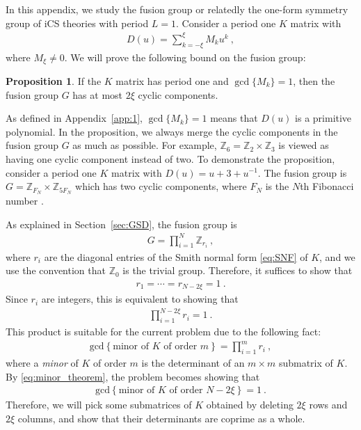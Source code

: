 \documentclass[aps,prb,twocolumn,superscriptaddress,floatfix,10pt,nofootinbib]{revtex4-2}
\newcommand{\ie}{\begin{equation}\begin{aligned}}
\newcommand{\fe}{\end{aligned}\end{equation}}
\theoremstyle{definition}
\newtheorem{proposition}[definition]{Proposition}
\begin{document}
In this appendix, we study the fusion group or relatedly the one-form symmetry group of iCS theories with period $L=1$. Consider a period one $K$ matrix with
\ie
D(u)=\sum_{k=-\xi}^\xi M_ku^k~,
\fe
where $M_\xi\neq0$. We will prove the following bound on the fusion group:
\begin{proposition}\label{prop:fusion}
    If the $K$ matrix has period one and $\gcd\{M_k\}=1$, then the fusion group $G$ has at most $2\xi$ cyclic components.
\end{proposition}
\noindent 
As defined in Appendix~\ref{app:1}, $\gcd\{M_k\}=1$ means that $D(u)$ is a primitive polynomial. In the proposition, we always merge the cyclic components in the fusion group $G$ as much as possible. For example, $\mathbb{Z}_6=\mathbb{Z}_2\times\mathbb{Z}_3$ is viewed as having one cyclic component instead of two.  
To demonstrate the proposition, consider a period one $K$ matrix with $D(u)=u+3+u^{-1}$. The fusion group is $G=\mathbb{Z}_{F_N}\times\mathbb{Z}_{5F_N}$ which has two cyclic components, where $F_N$ is the $N$th Fibonacci number \cite{Ma:2020svo}.

As explained in Section~\ref{sec:GSD}, the fusion group is
\ie
G=\prod_{i=1}^{N}\mathbb{Z}_{r_i}~,
\fe
where $r_i$ are the diagonal entries of the Smith normal form \eqref{eq:SNF} of $K$, and we use the convention that $\mathbb{Z}_0$ is the trivial group. Therefore, it suffices to show that
\ie
r_1=\cdots=r_{N-2\xi}=1~.
\fe
Since $r_i$ are integers, this is equivalent to showing that
\ie\label{eq:fusion_group_product}
\prod_{i=1}^{N-2\xi}r_i=1~.
\fe
This product is suitable for the current problem due to the following fact:
\ie\label{eq:minor_theorem}
\text{gcd}\left\{\text{minor of } K \text{ of order $m$}\right\}=\prod_{i=1}^{m}r_i~,
\fe
where a \textit{minor} of $K$ of order $m$ is the determinant of an $m\times m$ submatrix of $K$. By \eqref{eq:minor_theorem}, the problem becomes showing that
\ie\label{eq:minor_fusion}
\text{gcd}\left\{\text{minor of } K \text{ of order $N-2\xi$}\right\}=1~.
\fe
Therefore, we will pick some submatrices of $K$ obtained by deleting $2\xi$ rows and $2\xi$ columns, and show that their determinants are coprime as a whole. 
\end{document}
